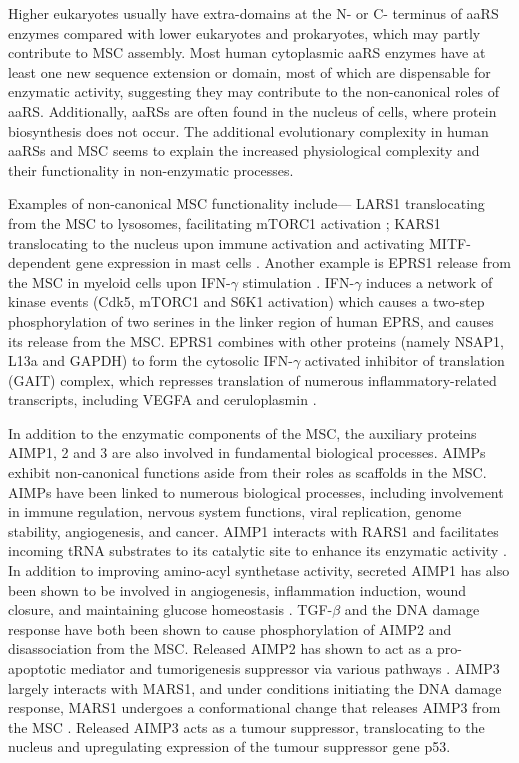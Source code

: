 Higher eukaryotes usually have extra-domains at the N- or C- terminus of aaRS enzymes compared with lower eukaryotes and prokaryotes, which may partly contribute to MSC assembly.
Most human cytoplasmic aaRS enzymes have at least one new sequence extension or domain, most of which are dispensable for enzymatic activity, suggesting they may contribute to the non-canonical roles of aaRS.
Additionally, aaRSs are often found in the nucleus of cells, where protein biosynthesis does not occur.
The additional evolutionary complexity in human aaRSs and MSC seems to explain the increased physiological complexity and their functionality in non-enzymatic processes.

Examples of non-canonical MSC functionality include--- LARS1 translocating from the MSC to lysosomes, facilitating mTORC1 activation \cite{han2012leucyl}; KARS1 translocating to the nucleus upon immune activation and activating MITF-dependent gene expression in mast cells \cite{yannay2009lysrs}.
Another example is EPRS1 release from the MSC in myeloid cells upon IFN-$\gamma$ stimulation \cite{arif2009two}.
IFN-$\gamma$ induces a network of kinase events (Cdk5, mTORC1 and S6K1 activation) which causes a two-step phosphorylation of two serines in the linker region of human EPRS, and causes its release from the MSC.
EPRS1 combines with other proteins (namely NSAP1, L13a and GAPDH) to form the cytosolic IFN-$\gamma$ activated inhibitor of translation (GAIT) complex, which represses translation of numerous inflammatory-related transcripts, including VEGFA and ceruloplasmin \cite{arif2018gait}.


In addition to the enzymatic components of the MSC, the auxiliary proteins AIMP1, 2 and 3 are also involved in fundamental biological processes.
AIMPs exhibit non-canonical functions aside from their roles as scaffolds in the MSC.
AIMPs have been linked to numerous biological processes, including involvement in immune regulation, nervous system functions, viral replication, genome stability, angiogenesis, and cancer.
AIMP1 interacts with RARS1 and facilitates incoming tRNA substrates to its catalytic site to enhance its enzymatic activity \cite{park1999precursor}.
In addition to improving amino-acyl synthetase activity, secreted AIMP1 has also been shown to be involved in angiogenesis, inflammation induction, wound closure, and maintaining glucose homeostasis \cite{park2006hormonal}.
TGF-$\beta$ and the DNA damage response have both been shown to cause phosphorylation of AIMP2 and disassociation from the MSC.
Released AIMP2 has shown to act as a pro-apoptotic mediator and tumorigenesis suppressor via various pathways \cite{zhou2020roles}.
AIMP3 largely interacts with MARS1, and under conditions initiating the DNA damage response, MARS1 undergoes a conformational change that releases AIMP3 from the MSC \cite{kwon2011dual}.
Released AIMP3 acts as a tumour suppressor, translocating to the nucleus and upregulating expression of the tumour suppressor gene p53.

